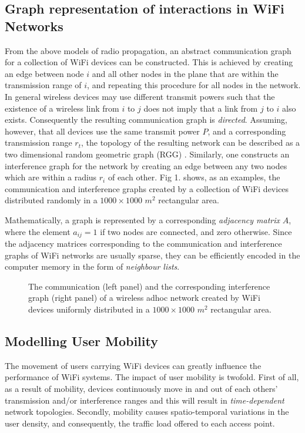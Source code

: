 \documentclass{elsart}
\begin{document}
\subsection{Graph representation of interactions in WiFi Networks}
From the above models of radio propagation, an abstract 
communication graph  for a collection of WiFi devices can be constructed.
This is achieved by creating an edge between node $i$ and all other 
nodes in the plane that are  within the transmission range of $i$, 
and repeating this procedure for all nodes in the network.
In general wireless devices may use different transmit powers 
such that the existence of a wireless link from $i$ to $j$ does not imply 
that a link from $j$ to $i$ also exists. Consequently the resulting 
communication graph is {\it directed}. 
Assuming, however, that all devices use the same transmit power $P$, 
and a corresponding transmission range $r_t$,
the topology of the resulting network can be described as a 
two dimensional random geometric graph (RGG) \cite{rgg1}.
Similarly, one constructs an interference graph for the network by 
creating an edge between any two nodes which are within a radius $r_i$ of each other. Fig 1. shows, as an examples, the communication and 
interference graphs created by a collection of WiFi devices distributed 
randomly in a $1000\times 1000$ $m^2$ rectangular 
area.

Mathematically, a graph is represented by a corresponding  
{\it adjacency matrix} $A$, where the element $a_{ij}=1$ if two nodes are connected, and zero otherwise. Since the adjacency matrices corresponding to the communication and interference graphs 
of WiFi networks are usually  
sparse, they can be efficiently encoded in the computer memory in 
the form of {\it neighbour lists}.

\begin{figure}[t]

 \caption{The communication (left panel) and the corresponding
 interference graph (right panel) of a wireless adhoc network created
 by WiFi devices uniformly distributed in a $1000 \times 1000 $ $m^2$ 
rectangular area.}
\end{figure}

\subsection{ Modelling User Mobility}
The movement of users carrying  WiFi devices 
can greatly influence the performance of WiFi systems.
The impact of user mobility is twofold. First of all, as a result of mobility,
devices  continuously move in and out of each others' transmission and/or
interference ranges and this will  result in {\it time-dependent} network topologies. Secondly, mobility causes spatio-temporal variations in the user density, 
and consequently, the traffic load offered to each access point.
\end{document}
